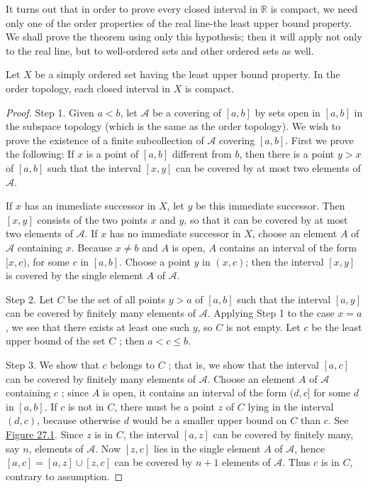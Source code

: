It turns out that in order to prove every closed interval in \(\mathbb{R}\) is compact, we need only one of the order properties of the real line-the least upper bound property. We shall prove the theorem using only this hypothesis; then it will apply not only to the real line, but to well-ordered sets and other ordered sets as well.

\begin{theorem}
\label{thm:\thetheorem}
 Let \(X\) be a simply ordered set having the least upper bound property. In the order topology, each closed interval in \(X\) is compact.

\end{theorem}
\begin{proof}
Step 1. Given \(a < b\), let \(\mathcal{A}\) be a covering of \([ {a,b}]\) by sets open in \([ {a,b}]\) in the subspace topology (which is the same as the order topology). We wish to prove the existence of a finite subcollection of \(\mathcal{A}\) covering \([ {a,b}]\). First we prove the following: If \(x\) is a point of \([ {a,b}]\) different from \(b\), then there is a point \(y > x\) of \([ {a,b}]\) such that the interval \([ {x,y}]\) can be covered by at most two elements of \(\mathcal{A}\).

If \(x\) has an immediate successor in \(X\), let \(y\) be this immediate successor. Then \([ {x,y}]\) consists of the two points \(x\) and \(y\), so that it can be covered by at most two elements of \(\mathcal{A}\). If \(x\) has no immediate successor in \(X\), choose an element \(A\) of \(\mathcal{A}\) containing \(x\). Because \(x \neq b\) and \(A\) is open, \(A\) contains an interval of the form \(\lbrack x,c)\), for some \(c\) in \([ {a,b}]\). Choose a point \(y\) in \((x, c)\); then the interval \([ {x,y}]\) is covered by the single element \(A\) of \(\mathcal{A}\).

Step 2. Let \(C\) be the set of all points \(y > a\) of \([ {a,b}]\) such that the interval \([ {a,y}]\) can be covered by finitely many elements of \(\mathcal{A}\). Applying Step 1 to the case \(x = a\), we see that there exists at least one such \(y\), so \(C\) is not empty. Let \(c\) be the least upper bound of the set \(C\) ; then \(a < c \leq b\).

Step 3. We show that \(c\) belongs to \(C\) ; that is, we show that the interval \([ {a,c}]\) can be covered by finitely many elements of \(\mathcal{A}\). Choose an element \(A\) of \(\mathcal{A}\) containing \(c\) ; since \(A\) is open, it contains an interval of the form \((d,c\rbrack\) for some \(d\) in \([ {a,b}]\). If \(c\) is not in \(C\), there must be a point \(z\) of \(C\) lying in the interval \((d, c)\), because otherwise \(d\) would be a smaller upper bound on \(C\) than \(c\). See \hyperref[fig:27.1]{Figure 27.1}. Since \(z\) is in \(C\), the interval \([ {a,z}]\) can be covered by finitely many, say \(n\), elements of \(\mathcal{A}\). Now \([ {z,c}]\) lies in the single element \(A\) of \(\mathcal{A}\), hence \([ {a,c}] = [ {a,z}] \cup [ {z,c}]\) can be covered by \(n + 1\) elements of \(\mathcal{A}\). Thus \(c\) is in \(C\), contrary to assumption.


\end{proof}
